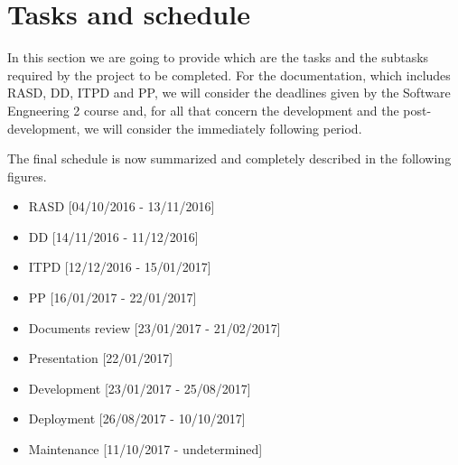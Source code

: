 \section{Tasks and schedule}

In this section we are going to provide which are the tasks and the subtasks required by the project to be completed. For the documentation, which includes RASD, DD, ITPD and PP, we will consider the deadlines given by the Software Engneering 2 course and, for all that concern the development and the post-development, we will consider the immediately following period.

The final schedule is now summarized and completely described in the following figures.

\begin{itemize}
	\item RASD [04/10/2016 - 13/11/2016]
	\item DD [14/11/2016 - 11/12/2016]
	\item ITPD [12/12/2016 - 15/01/2017]
	\item PP [16/01/2017 - 22/01/2017]
	\item Documents review [23/01/2017 - 21/02/2017]
	\item Presentation [22/01/2017]
	\item Development [23/01/2017 - 25/08/2017]
	\item Deployment [26/08/2017 - 10/10/2017]
	\item Maintenance [11/10/2017 - undetermined]
\end{itemize}

